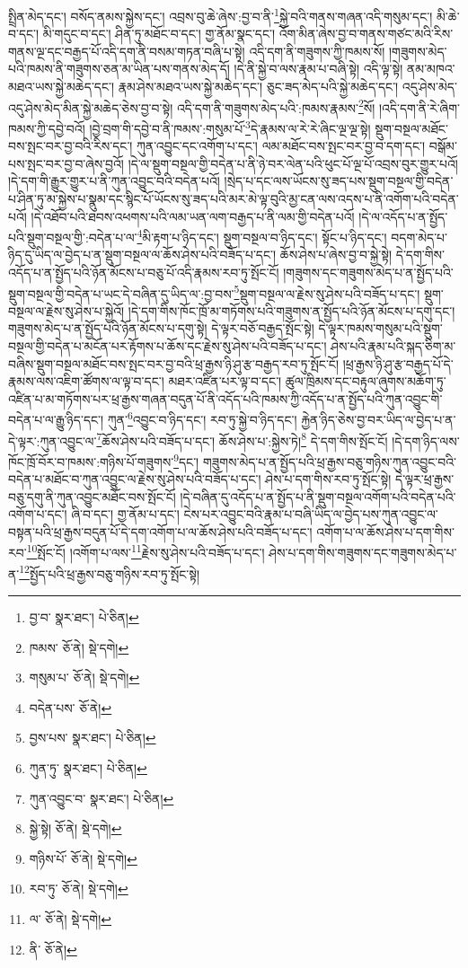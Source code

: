 སྤྲིན་མེད་དང་། བསོད་ནམས་སྐྱེས་དང་། འབྲས་བུ་ཆེ་ཞེས་:བྱ་བ་ནི་\footnote{བྱ་བ་  སྣར་ཐང་།  པེ་ཅིན། }སྐྱེ་བའི་གནས་གཞན་འདི་གསུམ་དང་། མི་ཆེ་བ་དང་། མི་གདུང་བ་དང་། ཤིན་ཏུ་མཐོང་བ་དང་། གྱ་ནོམ་སྣང་དང་། འོག་མིན་ཞེས་བྱ་བ་གནས་གཙང་མའི་རིས་གནས་ལྔ་དང་བརྒྱད་པོ་འདི་དག་ནི་བསམ་གཏན་བཞི་པ་སྟེ། འདི་དག་ནི་གཟུགས་ཀྱི་ཁམས་སོ། །གཟུགས་མེད་པའི་ཁམས་ནི་གཟུགས་ཅན་མ་ཡིན་པས་གནས་མེད་དོ། །དེ་ནི་སྐྱེ་བ་ལས་རྣམ་པ་བཞི་སྟེ། འདི་ལྟ་སྟེ། ནམ་མཁའ་མཐའ་ཡས་སྐྱེ་མཆེད་དང་། རྣམ་ཤེས་མཐའ་ཡས་སྐྱེ་མཆེད་དང་། ཅུང་ཟད་མེད་པའི་སྐྱེ་མཆེད་དང་། འདུ་ཤེས་མེད་འདུ་ཤེས་མེད་མིན་སྐྱེ་མཆེད་ཅེས་བྱ་བ་སྟེ། འདི་དག་ནི་གཟུགས་མེད་པའི་:ཁམས་རྣམས་\footnote{ཁམས་  ཅོ་ནེ།  སྡེ་དགེ། }སོ། །འདི་དག་ནི་རེ་ཞིག་ཁམས་ཀྱི་དབྱེ་བའོ། །བྱེ་བྲག་གི་དབྱེ་བ་ནི་ཁམས་:གསུམ་པོ་\footnote{གསུམ་པ་  ཅོ་ནེ།  སྡེ་དགེ། }དེ་རྣམས་ལ་རེ་རེ་ཞིང་ལྔ་ལྔ་སྟེ། སྡུག་བསྔལ་མཐོང་བས་སྤང་བར་བྱ་བའི་རིས་དང་། ཀུན་འབྱུང་དང་འགོག་པ་དང་། ལམ་མཐོང་བས་སྤང་བར་བྱ་བ་དག་དང་། བསྒོམ་པས་སྤང་བར་བྱ་བ་ཞེས་བྱའོ། །དེ་ལ་སྡུག་བསྔལ་གྱི་བདེན་པ་ནི་ཉེ་བར་ལེན་པའི་ཕུང་པོ་ལྔ་པོ་འབྲས་བུར་གྱུར་པའོ། །དེ་དག་གི་རྒྱུར་གྱུར་པ་ནི་ཀུན་འབྱུང་བའི་བདེན་པའོ། །སྲེད་པ་དང་ལས་ཡོངས་སུ་ཟད་པས་སྡུག་བསྔལ་གྱི་བདེན་པ་ཤིན་ཏུ་མ་སྐྱེས་པ་སྣུམ་དང་སྙིང་པོ་ཡོངས་སུ་ཟད་པའི་མར་མེ་ལྟ་བུའི་མྱ་ངན་ལས་འདས་པ་ནི་འགོག་པའི་བདེན་པའོ། །དེ་འཐོབ་པའི་ཐབས་འཕགས་པའི་ལམ་ཡན་ལག་བརྒྱད་པ་ནི་ལམ་གྱི་བདེན་པའོ། །དེ་ལ་འདོད་པ་ན་སྤྱོད་པའི་སྡུག་བསྔལ་གྱི་:བདེན་པ་ལ་\footnote{བདེན་པས་  ཅོ་ནེ། }མི་རྟག་པ་ཉིད་དང་། སྡུག་བསྔལ་བ་ཉིད་དང་། སྟོང་པ་ཉིད་དང་། བདག་མེད་པ་ཉིད་དུ་ཡིད་ལ་བྱེད་པ་ན་སྡུག་བསྔལ་ལ་ཆོས་ཤེས་པའི་བཟོད་པ་དང་། ཆོས་ཤེས་པ་ཞེས་བྱ་བ་སྐྱེ་སྟེ། དེ་དག་གིས་འདོད་པ་ན་སྤྱོད་པའི་ཉོན་མོངས་པ་བཅུ་པོ་འདི་རྣམས་རབ་ཏུ་སྤོང་ངོ། །གཟུགས་དང་གཟུགས་མེད་པ་ན་སྤྱོད་པའི་སྡུག་བསྔལ་གྱི་བདེན་པ་ཡང་དེ་བཞིན་དུ་ཡིད་ལ་:བྱ་བས་\footnote{བྱས་པས་  སྣར་ཐང་།  པེ་ཅིན། }སྡུག་བསྔལ་ལ་རྗེས་སུ་ཤེས་པའི་བཟོད་པ་དང་། སྡུག་བསྔལ་ལ་རྗེས་སུ་ཤེས་པ་སྐྱེའོ། །དེ་དག་གིས་ཁོང་ཁྲོ་མ་གཏོགས་པའི་གཟུགས་ན་སྤྱོད་པའི་ཉོན་མོངས་པ་དགུ་དང་། གཟུགས་མེད་པ་ན་སྤྱོད་པའི་ཉོན་མོངས་པ་དགུ་སྟེ། དེ་ལྟར་བཅོ་བརྒྱད་སྤོང་སྟེ། དེ་ལྟར་ཁམས་གསུམ་པའི་སྡུག་བསྔལ་གྱི་བདེན་པ་མངོན་པར་རྟོགས་པ་ཆོས་དང་རྗེས་སུ་ཤེས་པའི་བཟོད་པ་དང་། ཤེས་པའི་རྣམ་པའི་སྐད་ཅིག་མ་བཞིས་སྡུག་བསྔལ་མཐོང་བས་སྤང་བར་བྱ་བའི་ཕྲ་རྒྱས་ཉི་ཤུ་རྩ་བརྒྱད་རབ་ཏུ་སྤོང་ངོ། །ཕྲ་རྒྱས་ཉི་ཤུ་རྩ་བརྒྱད་པོ་དེ་རྣམས་ལས་འཇིག་ཚོགས་ལ་ལྟ་བ་དང་། མཐར་འཛིན་པར་ལྟ་བ་དང་། ཚུལ་ཁྲིམས་དང་བརྟུལ་ཞུགས་མཆོག་ཏུ་འཛིན་པ་མ་གཏོགས་པར་ཕྲ་རྒྱས་གཞན་བདུན་པོ་ནི་འདོད་པའི་ཁམས་ཀྱི་འདོད་པ་ན་སྤྱོད་པའི་ཀུན་འབྱུང་གི་བདེན་པ་ལ་རྒྱུ་ཉིད་དང་། ཀུན་\footnote{ཀུན་ཏུ་  སྣར་ཐང་།  པེ་ཅིན། }འབྱུང་བ་ཉིད་དང་། རབ་ཏུ་སྐྱེ་བ་ཉིད་དང་། རྐྱེན་ཉིད་ཅེས་བྱ་བར་ཡིད་ལ་བྱེད་པ་ན་དེ་ལྟར་:ཀུན་འབྱུང་ལ་\footnote{ཀུན་འབྱུང་བ་  སྣར་ཐང་།  པེ་ཅིན། }ཆོས་ཤེས་པའི་བཟོད་པ་དང་། ཆོས་ཤེས་པ་:སྐྱེས་ཏེ།\footnote{སྐྱེ་སྟེ།  ཅོ་ནེ།  སྡེ་དགེ། } དེ་དག་གིས་སྤོང་ངོ། །དེ་དག་ཉིད་ལས་ཁོང་ཁྲོ་བོར་བ་ཁམས་:གཉིས་པོ་གཟུགས་\footnote{གཉིས་པོ་  ཅོ་ནེ།  སྡེ་དགེ། }དང་། གཟུགས་མེད་པ་ན་སྤྱོད་པའི་ཕྲ་རྒྱས་བཅུ་གཉིས་ཀུན་འབྱུང་བའི་བདེན་པ་མཐོང་བ་ཀུན་འབྱུང་ལ་རྗེས་སུ་ཤེས་པའི་བཟོད་པ་དང་། ཤེས་པ་དག་གིས་རབ་ཏུ་སྤོང་སྟེ། དེ་ལྟར་ཕྲ་རྒྱས་བཅུ་དགུ་ནི་ཀུན་འབྱུང་མཐོང་བས་སྤོང་ངོ། །དེ་བཞིན་དུ་འདོད་པ་ན་སྤྱོད་པ་ནི་སྡུག་བསྔལ་འགོག་པའི་བདེན་པའི་འགོག་པ་དང་། ཞི་བ་དང་། གྱ་ནོམ་པ་དང་། ངེས་པར་འབྱུང་བའི་རྣམ་པ་བཞི་ཡིད་ལ་བྱེད་པས་ཀུན་འབྱུང་ལ་བསྟན་པའི་ཕྲ་རྒྱས་བདུན་པོ་དེ་དག་འགོག་པ་ལ་ཆོས་ཤེས་པའི་བཟོད་པ་དང་། འགོག་པ་ལ་ཆོས་ཤེས་པ་དག་གིས་རབ་\footnote{རབ་ཏུ་  ཅོ་ནེ།  སྡེ་དགེ། }སྤོང་ངོ། །འགོག་པ་ལས་\footnote{ལ་  ཅོ་ནེ།  སྡེ་དགེ། }རྗེས་སུ་ཤེས་པའི་བཟོད་པ་དང་། ཤེས་པ་དག་གིས་གཟུགས་དང་གཟུགས་མེད་པ་ན་\footnote{ནི་  ཅོ་ནེ། }སྤྱོད་པའི་ཕྲ་རྒྱས་བཅུ་གཉིས་རབ་ཏུ་སྤོང་སྟེ། 